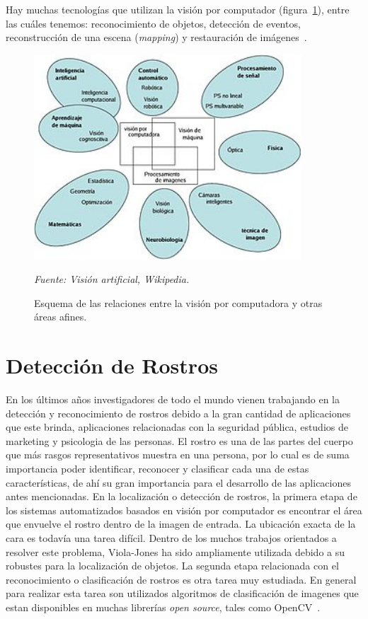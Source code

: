 Hay muchas tecnologías que utilizan la visión por computador (figura~\ref{fig:esquema_vision_computador}), entre las cuáles tenemos: reconocimiento de objetos, detección de eventos, reconstrucción de una escena (\textit{mapping}) y restauración de imágenes~\cite{15VC}.


\begin{figure}[H]
		\centering
		\includegraphics[width=100mm]{./Imagenes/esquema_vision_computador.jpg}
		\caption{Esquema de las relaciones entre la visión por computadora y otras áreas afines.}
		\vspace{0.15cm}
		\textit{Fuente: Visión artificial, Wikipedia.}
		\label{fig:esquema_vision_computador}
\end{figure}  


\section{Detección de Rostros}
En los últimos años investigadores de todo el mundo vienen trabajando en la detección y reconocimiento de rostros debido a la gran cantidad de aplicaciones que este brinda, aplicaciones relacionadas con la seguridad pública, estudios de marketing y psicologia de las personas. El rostro es una de las partes del cuerpo que más rasgos representativos muestra en una persona, por lo cual es de suma importancia poder identificar, reconocer y clasificar cada una de estas características, de ahí su gran importancia para el desarrollo de las aplicaciones antes mencionadas. En la localización o detección de rostros, la primera etapa de los sistemas automatizados basados en visión por computador es encontrar el área que envuelve el rostro dentro de la imagen de entrada. La ubicación exacta de la cara es todavía una tarea difícil. Dentro de los muchos trabajos orientados a resolver este problema, Viola-Jones \cite{viola2001rapid} ha sido ampliamente utilizada debido a su robustes para la localización de objetos. La segunda etapa relacionada con el reconocimiento o clasificación de rostros es otra tarea muy estudiada. En general para realizar esta tarea son utilizados algoritmos de clasificación de imagenes que estan disponibles en muchas librerías \textit{open source}, tales como OpenCV~\cite{20padilla2012evaluation}.

